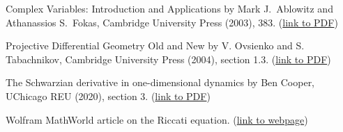 \documentclass[11pt,leqno]{article}
\theoremstyle{plain}
\theoremstyle{definition}
\numberwithin{equation}{section}
\numberwithin{lem}{section}
\begin{document}
Complex Variables: Introduction and Applications by Mark J.~Ablowitz and Athanassios S.~Fokas, Cambridge University Press (2003), 383. (\href{https://ftfsite.ru/wp-content/files/tfkp_endlish_2.2.pdf}{link to PDF})

Projective Differential Geometry Old and New by V. Ovsienko and S. Tabachnikov, Cambridge University Press (2004), section 1.3. (\href{https://drive.google.com/file/d/1pT7cxcGNZxCzmrkcY65SB-9dfruKkrSY/view?usp=share_link}{link to PDF})

The Schwarzian derivative in one-dimensional dynamics by Ben Cooper, UChicago REU (2020), section 3. (\href{https://math.uchicago.edu/~may/REU2020/REUPapers/Cooper.pdf}{link to PDF})

Wolfram MathWorld article on the Riccati equation. (\href{https://mathworld.wolfram.com/RiccatiDifferentialEquation.html}{link to webpage})
\end{document}
